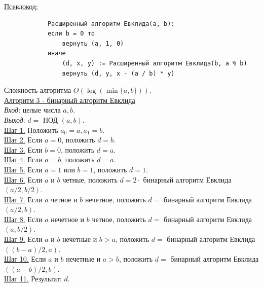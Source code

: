 \documentclass[bachelor, och, labwork]{SCWorks}
\begin{document}
        \underline{Псевдокод:}
            \begin{verbatim}
            Расширенный алгоритм Евклида(a, b):
            если b = 0 то
                вернуть (a, 1, 0)
            иначе
                (d, x, y) := Расширенный алгоритм Евклида(b, a % b)
                вернуть (d, y, x - (a / b) * y)                
            \end{verbatim}

            Сложность алгоритма $O(\log(\min\{a, b\}))$.\\


        \underline{Алгоритм 3 - бинарный алгоритм Евклида}\\
            \textit{Вход}: целые числа $a, b$.\\
            \textit{Выход}: $d =$ НОД $(a, b)$.\\
            \underline{Шаг 1.} Положить $a_0 = a, a_1 = b$.\\ 
            \underline{Шаг 2.} Если $a = 0$, положить $d = b$.\\
            \underline{Шаг 3.} Если $b = 0$, положить $d = a$.\\
            \underline{Шаг 4.} Если $a = b$, положить $d = a$.\\
            \underline{Шаг 5.} Если $a = 1$ или $b = 1$, положить $d = 1$.\\
            \underline{Шаг 6.} Если $a$ и $b$ четные, положить $d = 2 \cdot$ бинарный алгоритм Евклида
            $(a / 2, b / 2)$.\\
            \underline{Шаг 7.} Если $a$ четное и $b$ нечетное, положить $d =$
            бинарный алгоритм Евклида $(a / 2, b)$.\\
            \underline{Шаг 8.} Если $a$ нечетное и $b$ четное, положить $d =$
            бинарный алгоритм Евклида $(a, b / 2)$.\\
            \underline{Шаг 9.} Если $a$ и $b$ нечетные и $b > a$, положить $d =$
            бинарный алгоритм Евклида $((b - a) / 2, a)$.\\
            \underline{Шаг 10.} Если $a$ и $b$ нечетные и $a > b$, положить $d =$
            бинарный алгоритм Евклида $((a - b) / 2, b)$.\\
            \underline{Шаг 11.} Результат: $d$.\\
\end{document}
